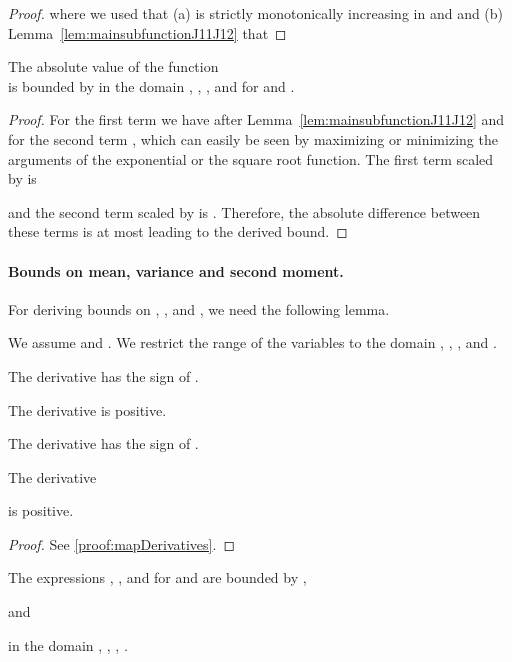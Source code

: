\documentclass{article}
\begin{document}
\begin{proof}

where we used that (a)  is strictly monotonically increasing in  and 
and (b) Lemma~\ref{lem:mainsubfunctionJ11J12} that 

\end{proof}


\begin{lemma}[Bound on J12]
\label{lem:J12}
The absolute value of the function \\ 
 is bounded by 
 in the domain , , , 
and  for  and .
\end{lemma}

\begin{proof}



For the first term we have   after 
Lemma~\ref{lem:mainsubfunctionJ11J12} and for the second term , which can easily be seen
by maximizing or minimizing the arguments of the exponential or the square root function. The first term scaled by  is

and the second term scaled by  is
.
Therefore, the absolute difference between these terms is at most 
leading to the derived bound.



\end{proof}




\paragraph{Bounds on mean, variance and second moment.}
For deriving bounds on , , and , we need 
the following lemma.

\begin{lemma}
\label{lem:mapDerivatives}
We assume  and .
We restrict the range of the variables to the domain
,
,
, and
.

The derivative 
has the sign of .

The derivative 
is positive.

The derivative 
has the sign of .

The derivative 

is positive.
\end{lemma}

\begin{proof}
 See \ref{proof:mapDerivatives}.
\end{proof}


\begin{lemma}
\label{lem:boundsmeanvar}
The expressions , , and 
for
 and 
are bounded by
,

and
 
in the domain , 
, ,  .
\end{lemma}
\end{document}

